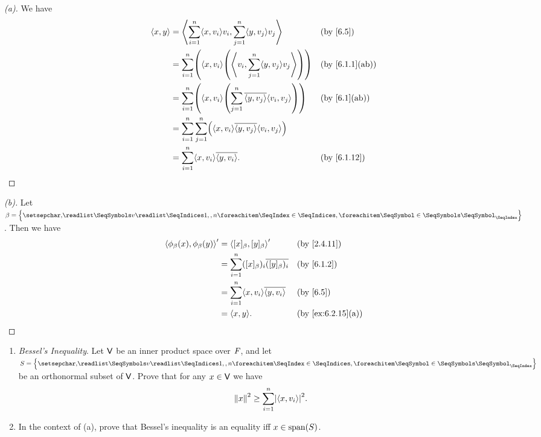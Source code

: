 \begin{proof}[(a)]
	We have
	\begin{align*}
		\inn{x, y} & = \inn{\sum_{i = 1}^n \inn{x, v_i} v_i, \sum_{j = 1}^n \inn{y, v_j} v_j}                  &  & \by{6.5}       \\
		           & = \sum_{i = 1}^n \pa{\inn{x, v_i} \pa{\inn{v_i, \sum_{j = 1}^n \inn{y, v_j} v_j}}}        &  & \by{6.1.1}[ab] \\
		           & = \sum_{i = 1}^n \pa{\inn{x, v_i} \pa{\sum_{j = 1}^n \conj{\inn{y, v_j}} \inn{v_i, v_j}}} &  & \by{6.1}[ab]   \\
		           & = \sum_{i = 1}^n \sum_{j = 1}^n \pa{\inn{x, v_i} \conj{\inn{y, v_j}} \inn{v_i, v_j}}                          \\
		           & = \sum_{i = 1}^n \inn{x, v_i} \conj{\inn{y, v_i}}.                                        &  & \by{6.1.12}
	\end{align*}
\end{proof}

\begin{proof}[(b)]
	Let \(\beta = \set{\seq{v}{1,,n}}\).
	Then we have
	\begin{align*}
		\inn{\phi_{\beta}(x), \phi_{\beta}(y)}' & = \inn{[x]_{\beta}, [y]_{\beta}}'                       &  & \by{2.4.11}       \\
		                                        & = \sum_{i = 1}^n ([x]_{\beta})_i \conj{([y]_{\beta})_i} &  & \by{6.1.2}        \\
		                                        & = \sum_{i = 1}^n \inn{x, v_i} \conj{\inn{y, v_i}}       &  & \by{6.5}          \\
		                                        & = \inn{x, y}.                                           &  & \by{ex:6.2.15}[a]
	\end{align*}
\end{proof}

\begin{ex}\label{ex:6.2.16}
	\begin{enumerate}
		\item \emph{Bessel's Inequality}.
		      Let \(\mathsf{V}\) be an inner product space over \(\mathit{F}\), and let \(S = \set{\seq{v}{1,,n}}\) be an orthonormal subset of \(\mathsf{V}\).
		      Prove that for any \(x \in \mathsf{V}\) we have
		      \[
			      \norm{x}^2 \geq \sum_{i = 1}^n \abs{\inn{x, v_i}}^2.
		      \]
		\item In the context of (a), prove that Bessel's inequality is an equality iff \(x \in \spn{S}\).
	\end{enumerate}
\end{ex}

